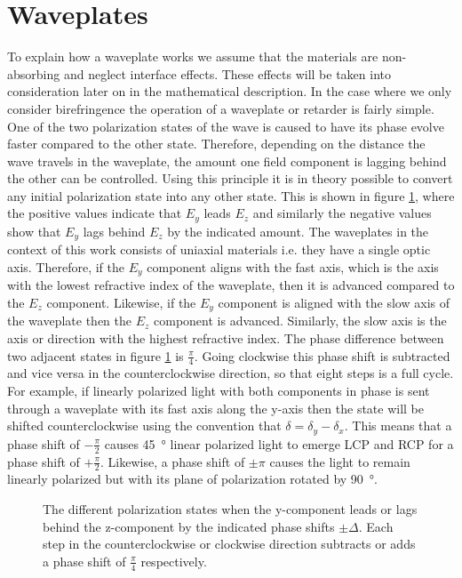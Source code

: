\section{Waveplates}
\label{sec:waveplates}
To explain how a waveplate works we assume that the materials are non-absorbing and neglect interface effects. These effects will be taken into consideration later on in the mathematical description. In the case where we only consider birefringence the operation of a waveplate or retarder is fairly simple. One of the two polarization states of the wave is caused to have its phase evolve faster compared to the other state. Therefore, depending on the distance the wave travels in the waveplate, the amount one field component is lagging behind the other can be controlled. Using this principle it is in theory possible to convert any initial polarization state into any other state. This is shown in figure \ref{fig:waveplate_conversions}, where the positive values indicate that $E_y$ leads $E_z$ and similarly the negative values show that $E_y$ lags behind $E_z$ by the indicated amount. The waveplates in the context of this work consists of uniaxial materials i.e. they have a single optic axis. Therefore, if the $E_y$ component aligns with the fast axis, which is the axis with the lowest refractive index of the waveplate, then it is advanced compared to the $E_z$ component. Likewise, if the $E_y$ component is aligned with the slow axis of the waveplate then the $E_z$ component is advanced. Similarly, the slow axis is the axis or direction with the highest refractive index. The phase difference between two adjacent states in figure \ref{fig:waveplate_conversions} is $\frac{\pi}{4}$. Going clockwise this phase shift is subtracted and vice versa in the counterclockwise direction, so that eight steps is a full cycle. For example, if linearly polarized light with both components in phase is sent through a waveplate with its fast axis along the y-axis then the state will be shifted counterclockwise using the convention that $\delta=\delta_y-\delta_x$. This means that a phase shift of $-\frac{\pi}{2}$ causes \SI{45}{\degree} linear polarized light to emerge LCP and RCP for a phase shift of $+\frac{\pi}{2}$. Likewise, a phase shift of $\pm \pi$ causes the light to remain linearly polarized but with its plane of polarization rotated by \SI{90}{\degree}.

\begin{figure}[h]
    \centering
    
    \caption{The different polarization states when the y-component leads or lags behind the z-component by the indicated phase shifts $\pm \Delta$. Each step in the counterclockwise or clockwise direction subtracts or adds a phase shift of $\frac{\pi}{4}$ respectively.}
    \label{fig:waveplate_conversions}
\end{figure}

